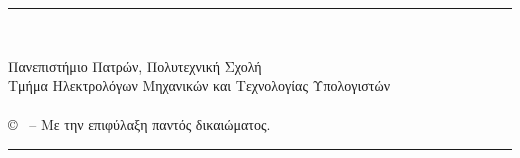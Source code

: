 \pagestyle{empty}

\vspace*{\fill}
\noindent \hspace{2cm} \rule{12.7cm}{0.4pt}\\
\vspace{-1.7em}
\begin{flushleft}
	\hspace*{30mm}Πανεπιστήμιο Πατρών, Πολυτεχνική Σχολή\\
	\hspace*{30mm}Τμήμα Ηλεκτρολόγων Μηχανικών και Τεχνολογίας Υπολογιστών\\
	\hspace*{30mm}{\nomme}\\
	\hspace*{30mm}© \monthyear \ -- Με την επιφύλαξη παντός δικαιώματος.\\
\end{flushleft}
\vspace{-1.2em}
\noindent \hspace{2cm} \rule{12.7cm}{0.4pt}
